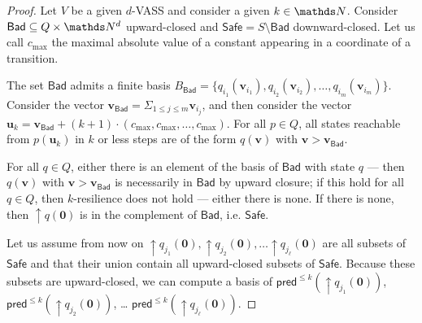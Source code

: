\documentclass[runningheads]{llncs}
\newcommand{\pred}{\textsf{pred}}
\newcommand{\Bad}{\textsf{Bad}}
\newcommand{\Safe}{\textsf{Safe}}
\begin{document}
\begin{proof}
\iffalse
Let $V$ be a given $d$-VASS and consider a given $k \in \N$.
Consider $\Bad \subseteq Q \times \N^d$ upward-closed and 
$\Safe = S \setminus \Bad$
 downward-closed.
Let us call $c_{\max}$ the maximal absolute value of a constant appearing in a coordinate of a transition.

The set $\Bad$ admits a finite basis 
$B_\Bad = \{ q_{i_1}(\textbf{v}_{i_1}), q_{i_2}(\textbf{v}_{i_2}), \ldots,
q_{i_m}(\textbf{v}_{i_m}) \}$.
Consider the vector $\textbf{v}_{\Bad} = \Sigma_{1 \leq j \leq m} \textbf{v}_{i_j}$,
and then consider the vector
$\textbf{u}_k = \textbf{v}_{\Bad} + (k+1) \cdot (c_{\max}, c_{\max}, \ldots, c_{\max})$.
For all $p \in Q$, all states reachable from $p(\textbf{u}_k)$ in $k$ or less steps are 
of the form $q(\textbf{v})$ with $ \textbf{v} > \textbf{v}_{\Bad}$.

For all $q \in Q$, either there is an element of the basis of $\Bad$ with state $q$ \----
then $q(\textbf{v})$ with $\textbf{v} > \textbf{v}_{\Bad}$ is necessarily in $\Bad$ by upward closure; if this hold for all $q \in Q$, then $k$-resilience does not hold \---- either there is none. If there is none, then 
$\mathop{\uparrow} q(\textbf{0})$
 is in the complement of $\Bad$, i.e. $\Safe$.

Let us assume from now on 
 $\mathop{\uparrow} q_{j_1}(\textbf{0}), \mathop{\uparrow} q_{j_2}(\textbf{0}), \ldots \mathop{\uparrow} q_{j_\ell}(\textbf{0})$ are
all subsets of $\Safe$ and that their union contain all upward-closed subsets of $\Safe$.
Because these subsets are upward-closed, we can compute a basis of
$\pred^{\leq k}(\mathop{\uparrow} q_{j_1}(\textbf{0}))$, $\pred^{\leq k}(\mathop{\uparrow} q_{j_2}(\textbf{0}))$, \ldots
$\pred^{\leq k}(\mathop{\uparrow} q_{j_\ell}(\textbf{0}))$.



\end{proof}
\end{document}
